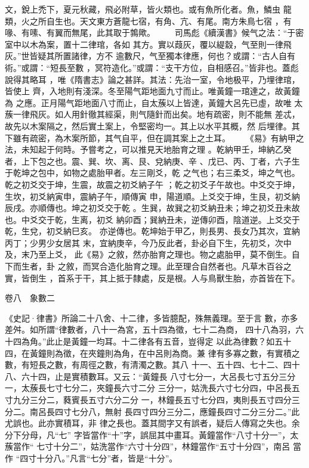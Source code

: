 \documentclass{ctexart}
\begin{document}
文，銳上禿下，夏元秋藏，飛必附草，皆火類也。或有魚所化者。魚，鱗虫 龍類，火之所自生也。天文東方蒼龍七宿，有角、亢、有尾。南方朱鳥七宿 ，有喙、有嗉、有翼而無尾，此其取于鶉歟。 　　司馬彪《續漢書》候气之法：``于密室中以木為案，置十二律琯，各如 其方。實以葭灰，覆以緹縠，气至則一律飛灰。''世皆疑其所置諸律，方不 逾數尺，气至獨本律應，何也？或謂：``古人自有術。''或謂：``短長至數 ，冥符造化。''或謂：``支干方位，自相感召。''皆非也。蓋彪說得其略耳 ，唯《隋書志》論之甚詳。其法：先治一室，令地极平，乃埋律琯，皆使上 齊，入地則有淺深。冬至陽气距地面九寸而止。唯黃鐘一琯達之，故黃鐘為 之應。正月陽气距地面八寸而止，自太蔟以上皆達，黃鐘大呂先已虛，故唯 太蔟一律飛灰。如人用針徹其經渠，則气隨針而出矣。地有疏密，則不能無 差忒，故先以木案隔之，然后實土案上，令堅密均一。其上以水平其概，然 后埋律。其下雖有疏密，為木案所節，其气自平，但在調其案上之土耳。 　　《易》有納甲之法，未知起于何時。予嘗考之，可以推見天地胎育之理 。乾納甲壬，坤納乙癸者，上下包之也。震、巽、坎、离、艮、兌納庚、辛 、戊已、丙、丁者，六子生于乾坤之包中，如物之處胎甲者。左三剛爻，乾 之气也；右三柔爻，坤之气也。乾之初爻交于坤，生震，故震之初爻納子午 ；乾之初爻子午故也。中爻交于坤，生坎，初爻納寅申，震納子午，順傳寅 申，陽道順。上爻交于坤，生艮，初爻納辰戌。亦順傳也。坤之初爻交于乾 。生巽，故巽之初爻納丑未；坤之初爻丑未故也。中爻交于乾，生离，初爻 納卯酉；巽納丑未，逆傳卯酉，陰道逆。上爻交于乾，生兌，初爻納巳亥。 亦逆傳也。乾坤始于甲乙，則長男、長女乃其次，宜納丙丁；少男少女居其 末，宜納庚辛，今乃反此者，卦必自下生，先初爻，次中及，末乃至上爻， 此《易》之敘，然亦胎育之理也。物之處胎甲，莫不倒生。自下而生者，卦 之敘，而冥合造化胎育之理。此至理合自然者也。凡草木百谷之實，皆倒生 ，首系于干，其上抵于隸處，反是根。人与鳥獸生胎，亦首皆在下。

卷八　象數二

《史記·律書》所論二十八舍、十二律，多皆臆配，殊無義理。至于言 數，亦多差舛。如所謂``律數者，八十一為宮，五十四為徵，七十二為商， 四十八為羽，六十四為角。''此止是黃鐘一均耳。十二律各有五音，豈得定 以此為律數？如五十四，在黃鐘則為徵，在夾鐘則為角，在中呂則為商。兼 律有多寡之數，有實積之數，有短長之數，有周徑之數，有清濁之數。其八 十一、五十四、七十二、四十八、六十四，止是實積數耳。又云：``黃鐘長 八寸七分一，大呂長七寸五分三分一，太蔟長七寸七分二，夾鐘長六寸二分 三分一，姑洗長六寸七分四，中呂長五寸九分三分二，蕤賓長五寸六分二分 一，林鐘長五寸七分四，夷則長五寸四分三分二。南呂長四寸七分八，無射 長四寸四分三分二，應鐘長四寸二分三分二。''此尤誤也。此亦實積耳，非 律之長也。蓋其間字又有誤者，疑后人傳寫之失也。余分下分母，凡``七'' 字皆當作``十''字，誤屈其中畫耳。黃鐘當作``八寸十分一''，太蔟當作`` 七寸十分二''，姑洗當作``六寸十分四''，林鐘當作``五寸十分四''，南呂 當作 ``四寸十分八。''凡言``七分''者，皆是``十分''。
\end{document}
